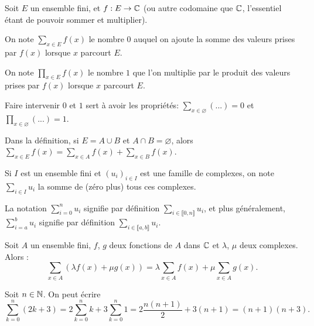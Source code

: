 \begin{definition}
\index{$\sum$}\index{$\prod$}
Soit $E$ un ensemble fini, et $f : E\to \mathbb{C}$ (ou autre codomaine que $\mathbb{C}$, l'essentiel étant de pouvoir sommer et multiplier).

On note $\sum_{x\in E} f(x)$ le nombre $0$ auquel on ajoute la somme des valeurs prises par $f(x)$ lorsque $x$ parcourt $E$.

On note $\prod_{x\in E} f(x)$ le nombre $1$ que l'on multiplie par le produit des valeurs prises par $f(x)$ lorsque $x$ parcourt $E$.
\end{definition}

\begin{remarque}
Faire intervenir $0$ et $1$ sert à avoir les propriétés: $\sum_{x\in \varnothing} (...)=0$ et $\prod_{x\in \varnothing} (...) = 1$.
\end{remarque}

\begin{remarque} Dans la définition, si $E=A\cup B$ et $A\cap B = \varnothing$, alors $\sum_{x\in E}f(x) = \sum_{x\in A}f(x)+\sum_{x\in B}f(x)$.
\end{remarque}

Si $I$ est un ensemble fini et $(u_i)_{i\in I}$ est une famille de complexes, on note $\sum_{i\in I} u_i$ la somme de (zéro plus) tous ces complexes. 

\begin{definition}
La notation $\sum_{i=0}^n u_i$ signifie par définition $\sum_{i\in \llbracket 0,n\rrbracket} u_i$, et plus généralement,  $\sum_{i=a}^b u_i$ signifie par définition $\sum_{i\in \llbracket a,b\rrbracket} u_i$. 
\end{definition}

\begin{proposition}
Soit $A$ un ensemble fini, $f$, $g$ deux fonctions de $A$ dans $\mathbb{C}$ et $\lambda$, $\mu$ deux complexes. Alors :
\[
\sum_{x\in A}(\lambda f(x)+\mu g(x)) 
= \lambda\sum_{x\in A}f(x)+ \mu\sum_{x\in A} g(x).
\]
\end{proposition}

\begin{exemple}
Soit $n\in \mathbb{N}$. On peut écrire 
\[
\sum_{k=0}^n (2k+3) 
= 2\sum_{k=0}^n k + 3\sum_{k=0}^n1 
= 2\frac{n(n+1)}{2}+3(n+1) 
= (n+1)(n+3).
\]
\end{exemple}

